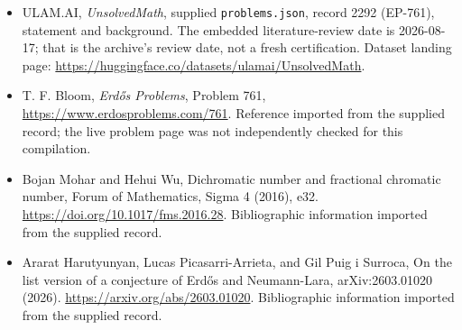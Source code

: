 \documentclass[11pt,a4paper]{article}
\begin{document}
{\small

\begin{itemize}

\item[\hypertarget{source:2292:1}{S1}] ULAM.AI, \emph{UnsolvedMath}, supplied \texttt{problems.json}, record 2292 (EP-761), statement and background. The embedded literature-review date is 2026-08-17; that is the archive’s review date, not a fresh certification. Dataset landing page: \url{https://huggingface.co/datasets/ulamai/UnsolvedMath}.

\item[\hypertarget{source:2292:2}{S2}] T. F. Bloom, \emph{Erdős Problems}, Problem 761, \url{https://www.erdosproblems.com/761}. Reference imported from the supplied record; the live problem page was not independently checked for this compilation.

\item[\hypertarget{source:2292:3}{S3}] Bojan Mohar and Hehui Wu, Dichromatic number and fractional chromatic number, Forum of Mathematics, Sigma 4 (2016), e32. \url{https://doi.org/10.1017/fms.2016.28}. Bibliographic information imported from the supplied record.

\item[\hypertarget{source:2292:4}{S4}] Ararat Harutyunyan, Lucas Picasarri-Arrieta, and Gil Puig i Surroca, On the list version of a conjecture of Erdős and Neumann-Lara, arXiv:2603.01020 (2026). \url{https://arxiv.org/abs/2603.01020}. Bibliographic information imported from the supplied record.

\end{itemize}

}

\label{end:2292}
\end{document}
